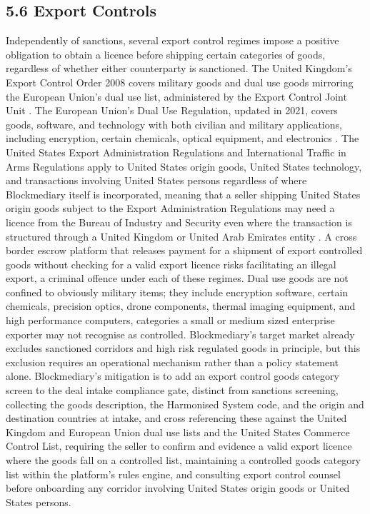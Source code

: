 \documentclass[12pt, a4paper]{article}
\begin{document}
\subsection*{5.6 Export Controls}

Independently of sanctions, several export control regimes impose a positive obligation to
obtain a licence before shipping certain categories of goods, regardless of whether either
counterparty is sanctioned. The United Kingdom's Export Control Order 2008 covers military
goods and dual use goods mirroring the European Union's dual use list, administered by the
Export Control Joint Unit \citep{ukeco2008}. The European Union's Dual Use Regulation,
updated in 2021, covers goods, software, and technology with both civilian and military
applications, including encryption, certain chemicals, optical equipment, and electronics
\citep{eudualuse2021}. The United States Export Administration Regulations and
International Traffic in Arms Regulations apply to United States origin goods, United
States technology, and transactions involving United States persons regardless of where
Blockmediary itself is incorporated, meaning that a seller shipping United States origin
goods subject to the Export Administration Regulations may need a licence from the Bureau
of Industry and Security even where the transaction is structured through a United Kingdom
or United Arab Emirates entity \citep{usear, usitar}. A cross border escrow platform that
releases payment for a shipment of export controlled goods without checking for a valid
export licence risks facilitating an illegal export, a criminal offence under each of
these regimes. Dual use goods are not confined to obviously military items; they include
encryption software, certain chemicals, precision optics, drone components, thermal
imaging equipment, and high performance computers, categories a small or medium sized
enterprise exporter may not recognise as controlled. Blockmediary's target market already
excludes sanctioned corridors and high risk regulated goods in principle, but this
exclusion requires an operational mechanism rather than a policy statement alone.
Blockmediary's mitigation is to add an export control goods category screen to the deal
intake compliance gate, distinct from sanctions screening, collecting the goods
description, the Harmonised System code, and the origin and destination countries at
intake, and cross referencing these against the United Kingdom and European Union dual use
lists and the United States Commerce Control List, requiring the seller to confirm and
evidence a valid export licence where the goods fall on a controlled list, maintaining a
controlled goods category list within the platform's rules engine, and consulting export
control counsel before onboarding any corridor involving United States origin goods or
United States persons.
\end{document}
